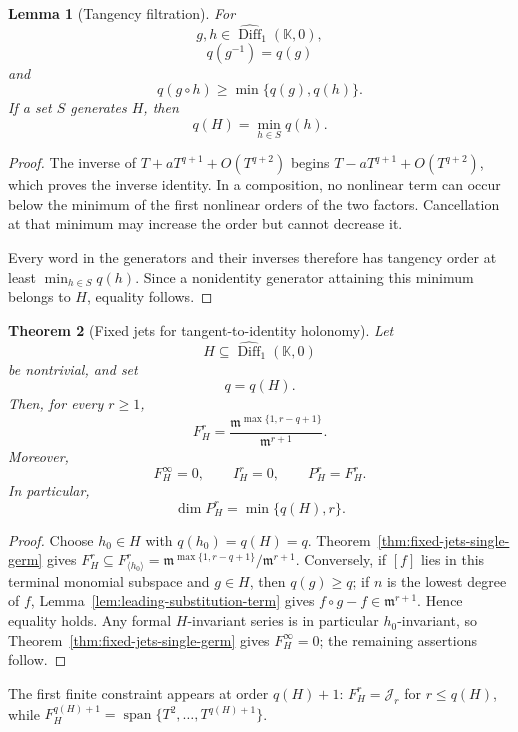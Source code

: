 \documentclass[11pt]{article}
\theoremstyle{plain}
\newtheorem{theorem}{Theorem}[section]
\newtheorem{lemma}[theorem]{Lemma}
\theoremstyle{definition}
\begin{document}
\begin{lemma}[Tangency filtration]
\label{lem:tangency-filtration}
For
\[
  g,h
  \in
  \widehat{\operatorname{Diff}}_1(\mathbb K,0),
\]
\[
  q(g^{-1})=q(g)
\]
and
\[
  q(g\circ h)
  \geq
  \min\{q(g),q(h)\}.
\]
If a set \(S\) generates \(H\), then
\[
  q(H)
  =
  \min_{h\in S}q(h).
\]
\end{lemma}

\begin{proof}
The inverse of \(T+aT^{q+1}+O(T^{q+2})\) begins
\(T-aT^{q+1}+O(T^{q+2})\),
which proves the inverse identity. In a composition, no nonlinear term
can occur below the minimum of the first nonlinear orders of the two
factors. Cancellation at that minimum may increase the order but
cannot decrease it.

Every word in the generators and their inverses therefore has tangency
order at least
\(\min_{h\in S}q(h)\).
Since a nonidentity generator attaining this minimum belongs to \(H\),
equality follows.
\end{proof}

\begin{theorem}[Fixed jets for tangent-to-identity holonomy]
\label{thm:complete-fixed-jet-classification}
Let
\[
  H
  \subseteq
  \widehat{\operatorname{Diff}}_1(\mathbb K,0)
\]
be nontrivial, and set
\[
  q=q(H).
\]
Then, for every \(r\geq1\),
\[
  \boxed{
  F_H^r
  =
  \frac{
    \mathfrak m^{\max\{1,r-q+1\}}
  }{
    \mathfrak m^{r+1}
  }.
  }
\]
Moreover,
\[
  \boxed{
  F_H^\infty=0,
  \qquad
  I_H^r=0,
  \qquad
  P_H^r=F_H^r.
  }
\]
In particular,
\[
  \boxed{
  \dim P_H^r
  =
  \min\{q(H),r\}.
  }
\]
\end{theorem}

\begin{proof}
Choose \(h_0\in H\) with \(q(h_0)=q(H)=q\). Theorem~\ref{thm:fixed-jets-single-germ} gives
\(F_H^r\subseteq F_{\langle h_0\rangle}^r=\mathfrak m^{\max\{1,r-q+1\}}/\mathfrak m^{r+1}\). Conversely, if \([f]\) lies in this terminal monomial subspace and \(g\in H\), then \(q(g)\ge q\); if \(n\) is the lowest degree of \(f\), Lemma~\ref{lem:leading-substitution-term} gives \(f\circ g-f\in\mathfrak m^{r+1}\). Hence equality holds. Any formal \(H\)-invariant series is in particular \(h_0\)-invariant, so Theorem~\ref{thm:fixed-jets-single-germ} gives \(F_H^\infty=0\); the remaining assertions follow.
\end{proof}

The first finite constraint appears at order \(q(H)+1\): \(F_H^r=\mathcal J_r\) for \(r\le q(H)\), while \(F_H^{q(H)+1}=\operatorname{span}\{T^2,\ldots,T^{q(H)+1}\}\).
\end{document}
